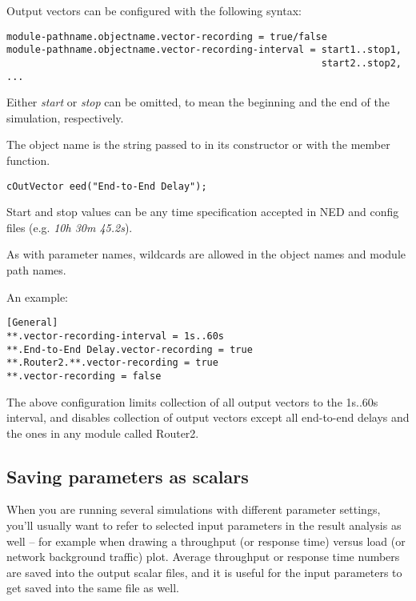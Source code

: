 Output vectors can be configured with the following syntax:

\begin{Verbatim}[commandchars=\\\{\}]
module-pathname.objectname.vector-recording = true/false
module-pathname.objectname.vector-recording-interval = start1..stop1,
                                                       start2..stop2, ...
\end{Verbatim}

Either \textit{start} or \textit{stop} can be omitted, to mean the
beginning and the end of the simulation, respectively.


The object name is the string passed to  in its constructor
or with the  member function.

\begin{verbatim}
cOutVector eed("End-to-End Delay");
\end{verbatim}

Start and stop values can be any time specification accepted
in NED and config files (e.g. \textit{10h 30m 45.2s}).

As with parameter names, wildcards are allowed in the object
names and module path names.

An example:

\begin{verbatim}
[General]
**.vector-recording-interval = 1s..60s
**.End-to-End Delay.vector-recording = true
**.Router2.**.vector-recording = true
**.vector-recording = false
\end{verbatim}

The above configuration limits collection of all output vectors
to the 1s..60s interval, and disables collection of output vectors
except all end-to-end delays and the ones in any module called Router2.


\subsection{Saving parameters as scalars}

When you are running several simulations with different parameter
settings, you'll usually want to refer to selected
input parameters in the result analysis as well -- for example when
drawing a throughput (or response time) versus load (or network
background traffic) plot. Average throughput or response time numbers
are saved into the output scalar files, and it is useful for the input
parameters to get saved into the same file as well.

